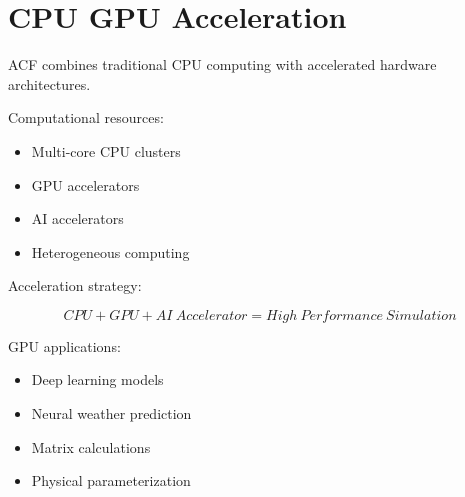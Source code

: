 \section{CPU GPU Acceleration}


ACF combines traditional CPU computing with accelerated
hardware architectures.



Computational resources:


\begin{itemize}

\item Multi-core CPU clusters

\item GPU accelerators

\item AI accelerators

\item Heterogeneous computing

\end{itemize}



Acceleration strategy:


\[
CPU
+
GPU
+
AI\ Accelerator
=
High\ Performance\ Simulation
\]


GPU applications:


\begin{itemize}

\item Deep learning models

\item Neural weather prediction

\item Matrix calculations

\item Physical parameterization

\end{itemize}
